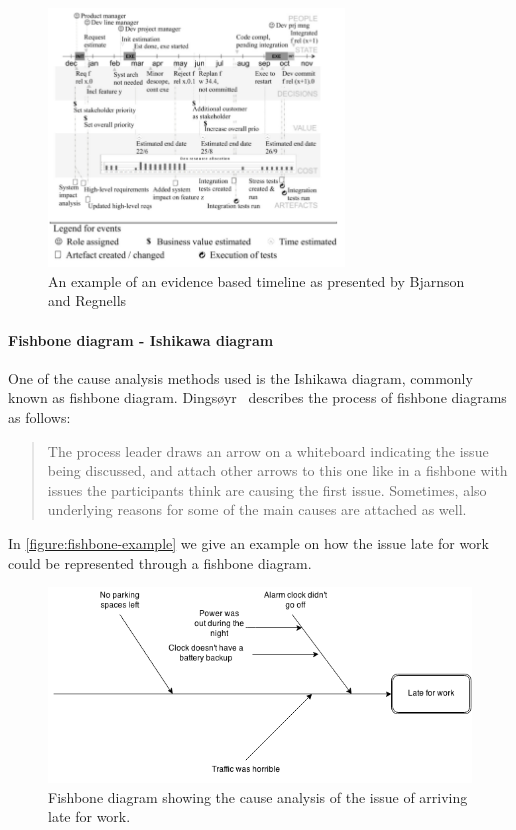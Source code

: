 \documentclass[12pt]{article}
\begin{document}
\begin{figure}[ht!]
	\centering
	\includegraphics[width=0.7\textwidth]{figures/timeline-derby.png}
	\caption{An example of an evidence based timeline as presented by Bjarnson and Regnells~\cite{Bjarnason2012}}
	\label{figure:Timeline-Derby}
\end{figure}


\paragraph{Fishbone diagram - Ishikawa diagram}
One of the cause analysis methods used is the Ishikawa diagram, commonly known as fishbone diagram. Dingsøyr~\cite{Dingsoyr2005} describes the process of fishbone diagrams as follows:
\begin{quote} The process leader draws an arrow on a whiteboard indicating the issue being discussed, and attach other arrows to this one like in a fishbone with issues the participants think are causing the first issue. Sometimes, also underlying reasons for some of the main causes are attached as well.
\end{quote}
In \autoref{figure:fishbone-example} we give an example on how the issue late for work could be represented through a fishbone diagram. 

\begin{figure}[h!]
	\centering
	\includegraphics[width=\textwidth]{figures/fishbone-example.png}
	\caption{Fishbone diagram showing the cause analysis of the issue of arriving late for work.}
	\label{figure:fishbone-example}
\end{figure}
\end{document}
